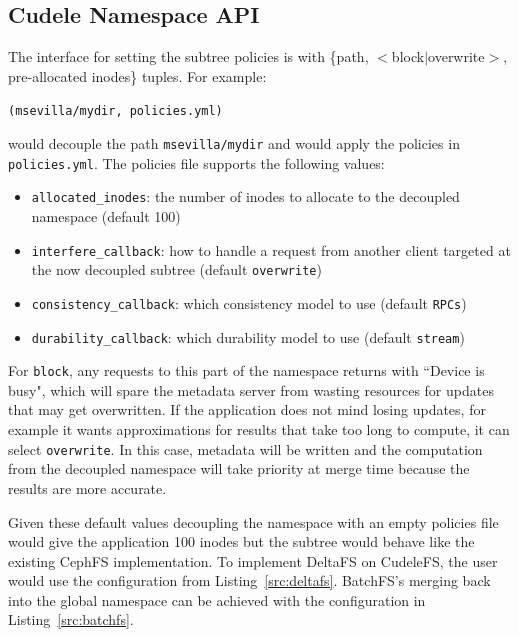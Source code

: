 \subsection{Cudele Namespace API}
\label{sec:cudele-namespace-api}

The interface for setting the subtree policies is with \{path,
\(<\)block\(|\)overwrite\(>\), pre-allocated inodes\} tuples. For example:

\texttt{(msevilla/mydir, policies.yml)}

would decouple the path \texttt{msevilla/mydir} and would apply the policies in
\texttt{policies.yml}. The policies file supports the following values:

\begin{itemize}

  \item \texttt{allocated\_inodes}: the number of inodes to allocate to the
  decoupled namespace (default 100)

  \item \texttt{interfere\_callback}: how to handle a request from another
  client targeted at the now decoupled subtree (default \texttt{overwrite})

  \item \texttt{consistency\_callback}: which consistency model to use (default
  \texttt{RPCs})

  \item \texttt{durability\_callback}: which durability model to use (default
  \texttt{stream})

\end{itemize}

For \texttt{block}, any requests to this part of the namespace returns with
``Device is busy", which will spare the metadata server from wasting resources
for updates that may get overwritten. If the application does not mind losing
updates, for example it wants approximations for results that take too long to
compute, it can select \texttt{overwrite}. In this case, metadata will be
written and the computation from the decoupled namespace will take priority at
merge time because the results are more accurate.

Given these default values decoupling the namespace with an empty policies file
would give the application 100 inodes but the subtree would behave like the
existing CephFS implementation. To implement DeltaFS on CudeleFS, the user
would use the configuration from Listing~\ref{src:deltafs}. BatchFS's merging
back into the global namespace can be achieved with the configuration in
Listing~\ref{src:batchfs}.


